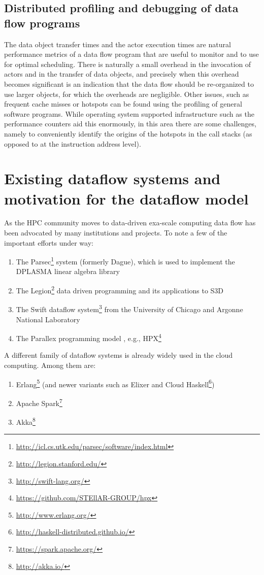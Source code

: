 \documentclass[11pt,a4paper]{article}
\begin{document}
\subsection{Distributed profiling and debugging of data flow programs}

The data object transfer times and the actor execution times are
natural performance metrics of a data flow program that are useful to
monitor and to use for optimal scheduling.  There is naturally a small
overhead in the invocation of actors and in the transfer of data
objects, and precisely when this overhead becomes significant is an
indication that the data flow should be re-organized to use larger
objects, for which the overheads are negligible.  Other issues, such
as frequent cache misses or hotspots can be found using the profiling
of general software programs.  While operating system supported
infrastructure such as the performance counters aid this enormously,
in this area there are some challenges, namely to conveniently
identify the origins of the hotspots in the call stacks (as opposed to
at the instruction address level).

\section{Existing dataflow systems and motivation for the dataflow model}

As the HPC community moves to data-driven exa-scale computing data
flow has been advocated by many institutions and projects.  To note a
few of the important efforts under way:

\begin{enumerate}
\item The
  Parsec\footnote{\url{http://icl.cs.utk.edu/parsec/software/index.html} }
  system (formerly Dague), which is used to implement the DPLASMA
  linear algebra library
 \item The Legion\footnote{\url{http://legion.stanford.edu/}{} } data
   driven programming and its applications to S3D
 \item The Swift dataflow system\footnote{\url{http://swift-lang.org/}
   } from the University of Chicago and Argonne National Laboratory
 \item The Parallex programming model \citep{Kaiser5364511}, e.g.,
   HPX\footnote{\url{https://github.com/STEllAR-GROUP/hpx} }
\end{enumerate}

A different family of dataflow systems is already widely used in the
cloud computing.  Among them are:
\begin{enumerate}
\item Erlang\footnote{\url{http://www.erlang.org/} } (and newer
  variants such as Elixer and Cloud
  Haskell\footnote{\url{http://haskell-distributed.github.io/} })
  \item Apache Spark\footnote{\url{https://spark.apache.org/} }
  \item Akka\footnote{\url{http://akka.io/} }
\end{enumerate}
\end{document}
